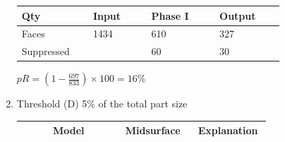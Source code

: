 \begin{enumerate}
\begin{minipage}[c]{0.6\linewidth}
\begin{tabular}[h]{@{} p{0.22\linewidth} p{0.18\linewidth} p{0.21\linewidth} p{0.2\linewidth} @{}}\toprule
\textbf{Qty} & \textbf{Input} & \textbf{Phase I} & \textbf{Output}\\  \midrule
Faces  & 1434 & 610 & 327\\
Suppressed  &  & 60 & 30\\
\bottomrule
\end{tabular}
\end{minipage}
\begin{minipage}[c]{0.38\linewidth}
$pR = (1 - \frac{697}{833}) \times 100 = 16\%$
\end{minipage}


\item Threshold (D) 5\% of the total part size


\begin{tabular}[h]{@{} p{0.12\linewidth}  p{0.28\linewidth} p{0.28\linewidth} p{0.28\linewidth}@{}}
\toprule
 & Model & Midsurface & Explanation \\
 \midrule
 

\end{tabular}
\end{enumerate}
